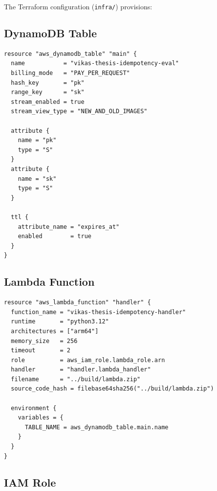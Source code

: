 The Terraform configuration (\texttt{infra/}) provisions:

\subsection{DynamoDB Table}

\begin{verbatim}
resource "aws_dynamodb_table" "main" {
  name           = "vikas-thesis-idempotency-eval"
  billing_mode   = "PAY_PER_REQUEST"
  hash_key       = "pk"
  range_key      = "sk"
  stream_enabled = true
  stream_view_type = "NEW_AND_OLD_IMAGES"

  attribute {
    name = "pk"
    type = "S"
  }
  attribute {
    name = "sk"
    type = "S"
  }

  ttl {
    attribute_name = "expires_at"
    enabled        = true
  }
}
\end{verbatim}

\subsection{Lambda Function}

\begin{verbatim}
resource "aws_lambda_function" "handler" {
  function_name = "vikas-thesis-idempotency-handler"
  runtime       = "python3.12"
  architectures = ["arm64"]
  memory_size   = 256
  timeout       = 2
  role          = aws_iam_role.lambda_role.arn
  handler       = "handler.lambda_handler"
  filename      = "../build/lambda.zip"
  source_code_hash = filebase64sha256("../build/lambda.zip")

  environment {
    variables = {
      TABLE_NAME = aws_dynamodb_table.main.name
    }
  }
}
\end{verbatim}

\subsection{IAM Role}

